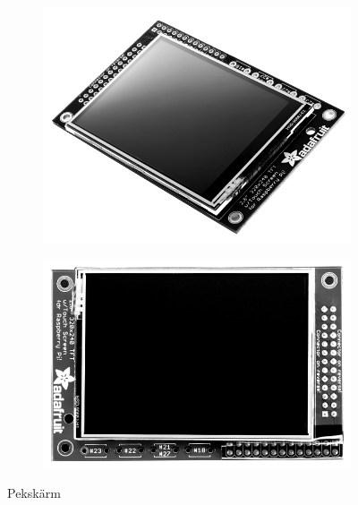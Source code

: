 \documentclass{article}
\begin{document}
                \begin{figure}[h!]
                    \centering
                    \begin{subfigure}[b]{0.45\textwidth}
                    \centering
                        \includegraphics[]{img/pitft1}
                        \label{fig:tft1}
                    \end{subfigure}
                    \begin{subfigure}[b]{0.45\textwidth}
                    \centering
                        \includegraphics[]{img/pitft2}
                        \label{fig:tft2}
                    \end{subfigure}
                \caption{Pekskärm}
                \label{fig:ada}
                \end{figure}
\end{document}
